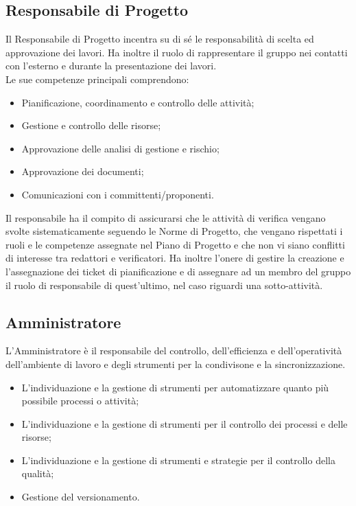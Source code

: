 \subsection{Responsabile di Progetto}
\label{2.1}
Il Responsabile di Progetto incentra su di sé le responsabilità di scelta ed approvazione dei lavori. Ha inoltre il ruolo di rappresentare il gruppo nei contatti con l'esterno e durante la presentazione dei lavori.\\

Le sue competenze principali comprendono:
\begin{itemize}
\item Pianificazione, coordinamento e controllo delle attività;
\item Gestione e controllo delle risorse;
\item Approvazione delle analisi di gestione e rischio;
\item Approvazione dei documenti;
\item Comunicazioni con i committenti/proponenti.
\end{itemize}

Il responsabile ha il compito di assicurarsi che le attività di verifica vengano svolte sistematicamente seguendo le Norme di Progetto, che vengano rispettati i ruoli e le competenze assegnate nel Piano di Progetto e che non vi siano conflitti di interesse tra redattori e verificatori. Ha inoltre l'onere di gestire la creazione e l'assegnazione dei ticket di pianificazione e di assegnare ad un membro del gruppo il ruolo di responsabile di quest'ultimo, nel caso riguardi una sotto-attività.

\subsection{Amministratore}
\label{2.2}
L'Amministratore è il responsabile del controllo, dell'efficienza e dell'operatività dell'ambiente di lavoro e degli strumenti per la condivisone e la sincronizzazione.

\begin{itemize}
\item L'individuazione e la gestione di strumenti per automatizzare quanto più possibile processi o attività;
\item L'individuazione e la gestione di strumenti per il controllo dei processi e delle risorse;
\item L'individuazione e la gestione di strumenti e strategie per il controllo della qualità;
\item Gestione del versionamento.
\end{itemize}

